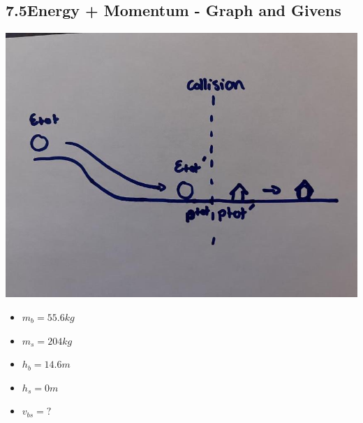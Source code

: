 \documentclass{article}
\begin{document}
\begin{adjustwidth}{1cm}{0pt}
    \subsection*{7.5\hspace*{0.5cm}Energy + Momentum - Graph and Givens}
    \begin{minipage}{0.5\textwidth}
        \includegraphics[scale=0.2]{./images/boulder.png}
    \end{minipage}
    \begin{minipage}{0.5\textwidth}
        \begin{itemize}
            \item $m_{b} = 55.6kg$
            \item $m_{s} = 204kg$
            \item $h_{b} = 14.6m$
            \item $h_{s} = 0m$
            \item $v_{bs} = ?$
        \end{itemize}
    \end{minipage}

\end{adjustwidth}
\end{document}

